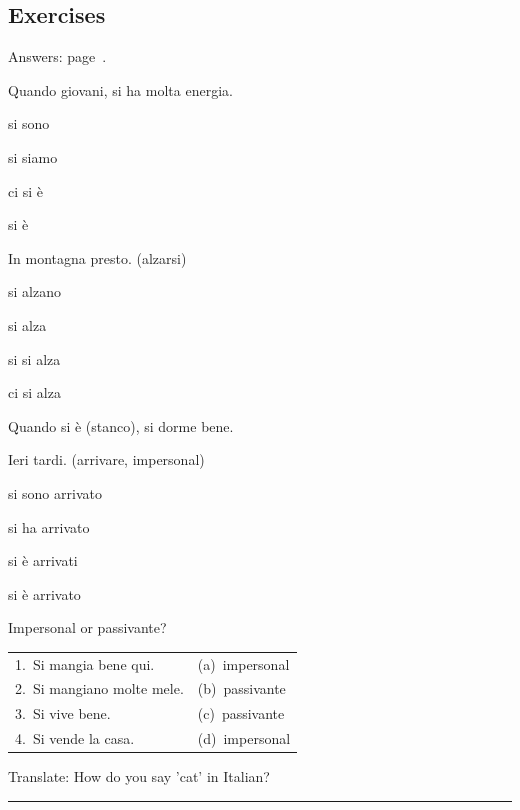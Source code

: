 \documentclass[11pt,a4paper,twoside,openright]{book}
\newcommand{\blank}{\underline{\hspace{2.6cm}}}
\newcommand{\answerline}{\par\vspace{6pt}\noindent\rule{0.75\linewidth}{0.4pt}\par}
\begin{document}
\subsection*{Exercises}\label{les:si-impersonale:exercises}
{\color{muted}\small Answers: page~\pageref{ans:si-impersonale}.}

\begin{exercises}
\item\label{ex:si-impersonale-1}\relax Quando \blank{} giovani, si ha molta energia.\par\nopagebreak\begin{options}
\item\relax si sono
\item\relax si siamo
\item\relax ci si è
\item\relax si è
\end{options}
\item\label{ex:si-impersonale-2}\relax In montagna \blank{} presto. (alzarsi)\par\nopagebreak\begin{options}
\item\relax si alzano
\item\relax si alza
\item\relax si si alza
\item\relax ci si alza
\end{options}
\item\label{ex:si-impersonale-3}\relax Quando si è \blank{} (stanco), si dorme bene.
\item\label{ex:si-impersonale-4}\relax Ieri \blank{} tardi. (arrivare, impersonal)\par\nopagebreak\begin{options}
\item\relax si sono arrivato
\item\relax si ha arrivato
\item\relax si è arrivati
\item\relax si è arrivato
\end{options}
\item\label{ex:si-impersonale-5}\relax Impersonal or passivante?\par\smallskip\begin{tabularx}{\linewidth}{@{}L L@{}}
1.\ Si mangia bene qui. & (a)\ impersonal \\
2.\ Si mangiano molte mele. & (b)\ passivante \\
3.\ Si vive bene. & (c)\ passivante \\
4.\ Si vende la casa. & (d)\ impersonal \\
\end{tabularx}
\item\label{ex:si-impersonale-6}\relax Translate: How do you say 'cat' in Italian?\par\answerline
\end{exercises}
\end{document}
